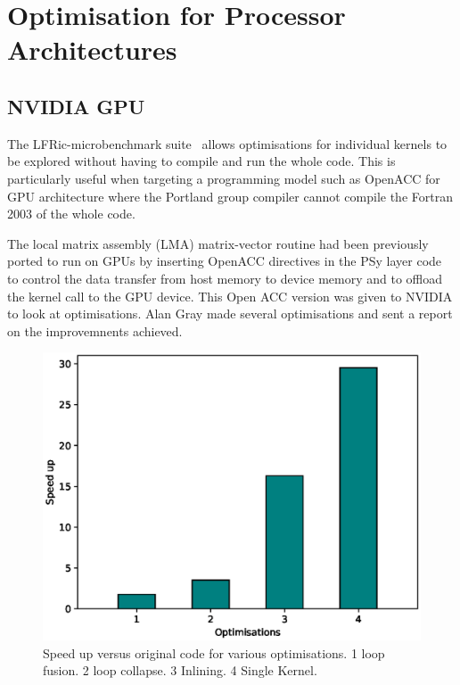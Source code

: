 \section{Optimisation for Processor Architectures
\label{sec:pa}}

\subsection{NVIDIA GPU}
The LFRic-microbenchmark suite~\cite{lfric-microbenchmarks} allows
optimisations for individual kernels to be explored without having to
compile and run the whole code. This is particularly useful when
targeting a programming model such as OpenACC for GPU architecture
where the Portland group compiler cannot compile the Fortran 2003 of
the whole code.

The local matrix assembly (LMA) matrix-vector routine had been
previously ported to run on GPUs by inserting OpenACC directives in
the PSy layer code to control the data transfer from host memory to
device memory and to offload the kernel call to the GPU device. This
Open ACC version was given to NVIDIA to look at optimisations. Alan
Gray made several optimisations and sent a report on the improvemnents
achieved.

\begin{figure}
\centering\includegraphics[width=1.0\linewidth]{figs/LMA-nvidia.eps}
\caption{\label{fig:lma_nvidia}Speed up versus original code for
  various optimisations. 1 loop fusion. 2 loop collapse. 3 Inlining. 4
  Single Kernel.}
\end{figure} 



